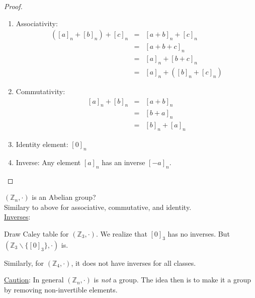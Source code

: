 \documentclass[12pt]{report}
\theoremstyle{definition}
\begin{document}
\begin{proof}
    \;

    \begin{enumerate}[label = (\arabic*)]
        \item Associativity: 
            \begin{eqnarray*}
                ({[a]}_{n} + {[b]}_{n}) + {[c]}_{n}
                &=& {[a + b]}_{n} + {[c]}_{n} \\
                &=& {[a + b + c]}_{n} \\
                &=& {[a]}_{n} + {[b + c]}_{n} \\
                &=& {[a]}_{n} + ({[b]}_{n} + {[c]}_{n})
            \end{eqnarray*}
            
        \item Commutativity:
            \begin{eqnarray*}
                {[a]}_{n} + {[b]}_{n}
                &=& {[a + b]}_{n} \\
                &=& {[b + a]}_{n} \\
                &=& {[b]}_{n} + {[a]}_{n}
            \end{eqnarray*}

        \item Identity element: ${[0]}_{n}$
        \item Inverse: Any element ${[a]}_{n}$ has an inverse ${[-a]}_{n}$.
            
    \end{enumerate}
    
\end{proof}

\begin{ex}
    $(\mathbb{Z}_n, \cdot)$ is an Abelian group?
    \\Similary to above for associative, commutative, and identity.
    \\\underline{Inverses}:

    Draw Caley table for $(\mathbb{Z}_3, \cdot)$.
    We realize that ${[0]}_{3}$ has no inverses.
    But $(\mathbb{Z}_3 \backslash \{{[0]}_{3}\}, \cdot)$ is.

    Similarly, for $(\mathbb{Z}_4, \cdot)$, it does not have inverses for all classes.

    \underline{Caution}: In general $(\mathbb{Z}_n, \cdot)$ is \emph{not}  a group.
    The idea then is to make it a group by removing non-invertible elements.
\end{ex}
\end{document}
